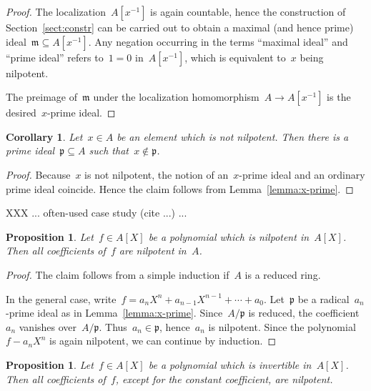 \documentclass[oneside,reqno]{amsart}
\theoremstyle{definition}
\theoremstyle{plain}
\newtheorem{prop}[defn]{Proposition}
\newtheorem{cor}[defn]{Corollary}
\theoremstyle{remark}
\newcommand{\mmm}{\mathfrak{m}}
\newcommand{\ppp}{\mathfrak{p}}
\renewcommand{\_}{\mathpunct{.}\,}
\begin{document}
\begin{proof}The localization~$A[x^{-1}]$ is again countable, hence the
construction of Section~\ref{sect:constr} can be carried out to obtain a
maximal (and hence prime) ideal~$\mmm \subseteq A[x^{-1}]$. Any negation
occurring in the terms ``maximal ideal'' and ``prime ideal'' refers to~$1 = 0$
in~$A[x^{-1}]$, which is equivalent to~$x$ being nilpotent.

The preimage of~$\mmm$ under the localization homomorphism~$A \to A[x^{-1}]$ is
the desired~$x$-prime ideal.
\end{proof}

\begin{cor}\label{prop:nilp-prime}Let~$x \in A$ be an element which is not nilpotent. Then there is a
prime ideal~$\ppp \subseteq A$ such that~$x \not\in \ppp$.
\end{cor}

\begin{proof}Because~$x$ is not nilpotent, the notion of an~$x$-prime ideal and
an ordinary prime ideal coincide. Hence the claim follows from
Lemma~\ref{lemma:x-prime}.\end{proof}

XXX ... often-used case study (cite ...) ...

\begin{prop}Let~$f \in A[X]$ be a polynomial which is nilpotent in~$A[X]$. Then
all coefficients of~$f$ are nilpotent in~$A$.
\end{prop}

\begin{proof}The claim follows from a simple induction if~$A$ is a reduced
ring.

In the general case, write~$f = a_n X^n + a_{n-1} X^{n-1} + \cdots + a_0$. Let~$\ppp$
be a radical~$a_n$-prime ideal as in Lemma~\ref{lemma:x-prime}. Since~$A/\ppp$
is reduced, the coefficient~$a_n$ vanishes over~$A/\ppp$. Thus~$a_n \in \ppp$,
hence~$a_n$ is nilpotent. Since the polynomial~$f - a_n X^n$ is again
nilpotent, we can continue by induction.
\end{proof}

\begin{prop}Let~$f \in A[X]$ be a polynomial which is invertible in~$A[X]$.
Then all coefficients of~$f$, except for the constant coefficient, are
nilpotent.\end{prop}
\end{document}
